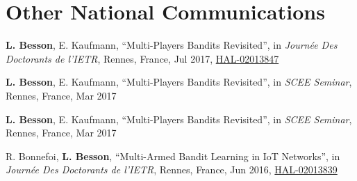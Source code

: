 

\section*{Other National Communications}
\renewcommand{\labelenumi}{[ONC-\arabic{enumi}]}
\begin{etaremune}
	\item \textbf{L. Besson}, E. Kaufmann, ``Multi-Players Bandits Revisited'', in \emph{Journ\'{e}e Des Doctorants de l'IETR}, Rennes, France, Jul 2017, \href{https://hal.inria.fr/hal-02013847}{HAL-02013847}
	\item \textbf{L. Besson}, E. Kaufmann, ``Multi-Players Bandits Revisited'', in \emph{SCEE Seminar}, Rennes, France, Mar 2017
	\item \textbf{L. Besson}, E. Kaufmann, ``Multi-Players Bandits Revisited'', in \emph{SCEE Seminar}, Rennes, France, Mar 2017
	\item	R. Bonnefoi, \textbf{L. Besson}, ``Multi-Armed Bandit Learning in IoT Networks'', in \emph{Journ\'{e}e Des Doctorants de l'IETR}, Rennes, France, Jun 2016, \href{https://hal.inria.fr/hal-02013839}{HAL-02013839}
\end{etaremune}


